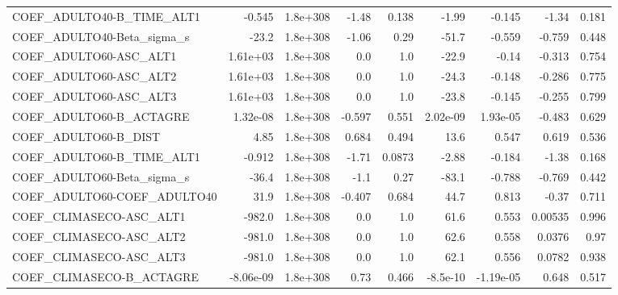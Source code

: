 \begin{tabular}{lrrrrrrrr}
COEF\_ADULTO40-B\_TIME\_ALT1         &      -0.545 &     1.8e+308 &   -1.48 &    0.138 &      -1.99 &      -0.145 &        -1.34 &         0.181 \\
COEF\_ADULTO40-Beta\_sigma\_s        &       -23.2 &     1.8e+308 &   -1.06 &     0.29 &      -51.7 &      -0.559 &       -0.759 &         0.448 \\
COEF\_ADULTO60-ASC\_ALT1            &    1.61e+03 &     1.8e+308 &     0.0 &      1.0 &      -22.9 &       -0.14 &       -0.313 &         0.754 \\
COEF\_ADULTO60-ASC\_ALT2            &    1.61e+03 &     1.8e+308 &     0.0 &      1.0 &      -24.3 &      -0.148 &       -0.286 &         0.775 \\
COEF\_ADULTO60-ASC\_ALT3            &    1.61e+03 &     1.8e+308 &     0.0 &      1.0 &      -23.8 &      -0.145 &       -0.255 &         0.799 \\
COEF\_ADULTO60-B\_ACTAGRE           &    1.32e-08 &     1.8e+308 &  -0.597 &    0.551 &   2.02e-09 &    1.93e-05 &       -0.483 &         0.629 \\
COEF\_ADULTO60-B\_DIST              &        4.85 &     1.8e+308 &   0.684 &    0.494 &       13.6 &       0.547 &        0.619 &         0.536 \\
COEF\_ADULTO60-B\_TIME\_ALT1         &      -0.912 &     1.8e+308 &   -1.71 &   0.0873 &      -2.88 &      -0.184 &        -1.38 &         0.168 \\
COEF\_ADULTO60-Beta\_sigma\_s        &       -36.4 &     1.8e+308 &    -1.1 &     0.27 &      -83.1 &      -0.788 &       -0.769 &         0.442 \\
COEF\_ADULTO60-COEF\_ADULTO40       &        31.9 &     1.8e+308 &  -0.407 &    0.684 &       44.7 &       0.813 &        -0.37 &         0.711 \\
COEF\_CLIMASECO-ASC\_ALT1           &      -982.0 &     1.8e+308 &     0.0 &      1.0 &       61.6 &       0.553 &      0.00535 &         0.996 \\
COEF\_CLIMASECO-ASC\_ALT2           &      -981.0 &     1.8e+308 &     0.0 &      1.0 &       62.6 &       0.558 &       0.0376 &          0.97 \\
COEF\_CLIMASECO-ASC\_ALT3           &      -981.0 &     1.8e+308 &     0.0 &      1.0 &       62.1 &       0.556 &       0.0782 &         0.938 \\
COEF\_CLIMASECO-B\_ACTAGRE          &   -8.06e-09 &     1.8e+308 &    0.73 &    0.466 &   -8.5e-10 &   -1.19e-05 &        0.648 &         0.517 \\

\end{tabular}
